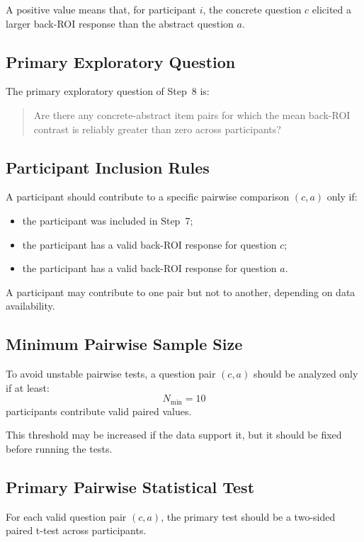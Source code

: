 \documentclass[11pt]{article}
\begin{document}
A positive value means that, for participant \(i\), the concrete question \(c\)
elicited a larger back-ROI response than the abstract question \(a\).

\subsection{Primary Exploratory Question}
The primary exploratory question of Step~8 is:
\begin{quote}
Are there any concrete-abstract item pairs for which the mean back-ROI contrast
is reliably greater than zero across participants?
\end{quote}

\subsection{Participant Inclusion Rules}
A participant should contribute to a specific pairwise comparison \((c,a)\) only if:
\begin{itemize}
    \item the participant was included in Step~7;
    \item the participant has a valid back-ROI response for question \(c\);
    \item the participant has a valid back-ROI response for question \(a\).
\end{itemize}

A participant may contribute to one pair but not to another, depending on data availability.

\subsection{Minimum Pairwise Sample Size}
To avoid unstable pairwise tests, a question pair \((c,a)\) should be analyzed only if at least:
\begin{equation}
N_{\min} = 10
\end{equation}
participants contribute valid paired values.

This threshold may be increased if the data support it, but it should be fixed before running the tests.

\subsection{Primary Pairwise Statistical Test}
For each valid question pair \((c,a)\), the primary test should be a two-sided paired t-test across participants.
\end{document}
